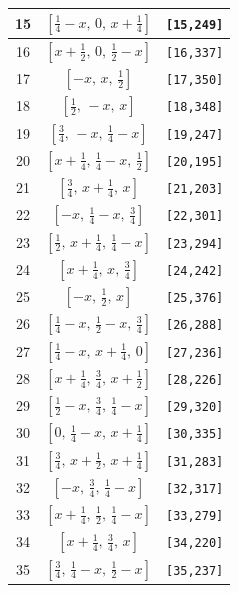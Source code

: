 \documentclass[fleqn,8pt]{jsarticle}
\begin{document}
\begin{longtable}{ccc}
15 & $\left[ \frac{1}{4} - x,\, 0,\, x + \frac{1}{4} \right]$ & {\tt [15,249]} \\ \hline
16 & $\left[ x + \frac{1}{2},\, 0,\, \frac{1}{2} - x \right]$ & {\tt [16,337]} \\ \hline
17 & $\left[ - x,\, x,\, \frac{1}{2} \right]$ & {\tt [17,350]} \\ \hline
18 & $\left[ \frac{1}{2},\, - x,\, x \right]$ & {\tt [18,348]} \\ \hline
19 & $\left[ \frac{3}{4},\, - x,\, \frac{1}{4} - x \right]$ & {\tt [19,247]} \\ \hline
20 & $\left[ x + \frac{1}{4},\, \frac{1}{4} - x,\, \frac{1}{2} \right]$ & {\tt [20,195]} \\ \hline
21 & $\left[ \frac{3}{4},\, x + \frac{1}{4},\, x \right]$ & {\tt [21,203]} \\ \hline
22 & $\left[ - x,\, \frac{1}{4} - x,\, \frac{3}{4} \right]$ & {\tt [22,301]} \\ \hline
23 & $\left[ \frac{1}{2},\, x + \frac{1}{4},\, \frac{1}{4} - x \right]$ & {\tt [23,294]} \\ \hline
24 & $\left[ x + \frac{1}{4},\, x,\, \frac{3}{4} \right]$ & {\tt [24,242]} \\ \hline
25 & $\left[ - x,\, \frac{1}{2},\, x \right]$ & {\tt [25,376]} \\ \hline
26 & $\left[ \frac{1}{4} - x,\, \frac{1}{2} - x,\, \frac{3}{4} \right]$ & {\tt [26,288]} \\ \hline
27 & $\left[ \frac{1}{4} - x,\, x + \frac{1}{4},\, 0 \right]$ & {\tt [27,236]} \\ \hline
28 & $\left[ x + \frac{1}{4},\, \frac{3}{4},\, x + \frac{1}{2} \right]$ & {\tt [28,226]} \\ \hline
29 & $\left[ \frac{1}{2} - x,\, \frac{3}{4},\, \frac{1}{4} - x \right]$ & {\tt [29,320]} \\ \hline
30 & $\left[ 0,\, \frac{1}{4} - x,\, x + \frac{1}{4} \right]$ & {\tt [30,335]} \\ \hline
31 & $\left[ \frac{3}{4},\, x + \frac{1}{2},\, x + \frac{1}{4} \right]$ & {\tt [31,283]} \\ \hline
32 & $\left[ - x,\, \frac{3}{4},\, \frac{1}{4} - x \right]$ & {\tt [32,317]} \\ \hline
33 & $\left[ x + \frac{1}{4},\, \frac{1}{2},\, \frac{1}{4} - x \right]$ & {\tt [33,279]} \\ \hline
34 & $\left[ x + \frac{1}{4},\, \frac{3}{4},\, x \right]$ & {\tt [34,220]} \\ \hline
35 & $\left[ \frac{3}{4},\, \frac{1}{4} - x,\, \frac{1}{2} - x \right]$ & {\tt [35,237]} \\ \hline

\end{longtable}
\end{document}
